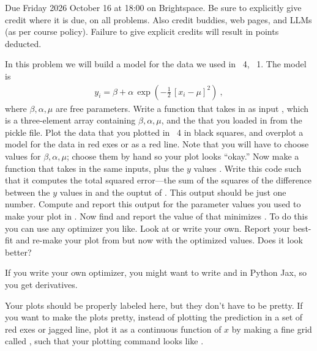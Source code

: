 \documentclass[12pt]{article}
\begin{document}
Due Friday 2026 October 16 at 18:00 on Brightspace.
Be sure to explicitly give credit where it is due, on all problems.
Also credit buddies, web pages, and LLMs (as per course policy).
Failure to give explicit credits will result in points deducted.

\begin{problem}
  In this problem we will build a model for the data we used in \psname~4, \problemname~1.
  The model is
  \begin{align}
    y_i = \beta + \alpha\,\exp(-\frac{1}{2}\,[x_i - \mu]^2) ~,
  \end{align}
  where $\beta,\alpha,\mu$ are free parameters.
  \subpart\label{sub:start}
  Write a function  that takes in as input ,
  which is a three-element array containing $\beta,\alpha,\mu$, and the 
  that you loaded in from the pickle file.
  Plot the data that you plotted in \psname~4 in black squares, and overplot a model for the data
  in red exes or as a red line.
  Note that you will have to choose values for $\beta,\alpha,\mu$; choose them by hand so your plot looks ``okay.''
  \subpart
  Now make a function  that takes in the same inputs, plus
  the $y$ values .
  Write this code such that it computes the total squared error---the sum of the squares of the difference between the $y$ values in  and the ouptut of .
  This output should be just one number.
  Compute and report this output for the parameter values you used to make your plot in .
  \subpart
  Now find and report the value of  that minimizes .
  To do this you can use any optimizer you like.
  Look at  or write your own.
  Report your best-fit  and re-make your plot from  but now with the optimized values.
  Does it look better?
\end{problem}

\begin{note}
  If you write your own optimizer, you might want to write  and  in Python Jax, so you get derivatives.
\end{note}

\begin{note}
  Your plots should be properly labeled here, but they don't have to be pretty.
  If you want to make the plots pretty, instead of plotting the prediction in a set of red exes or jagged line,
  plot it as a continuous function of $x$ by making a fine grid called ,
  such that your plotting command looks like .
\end{note}
\end{document}
